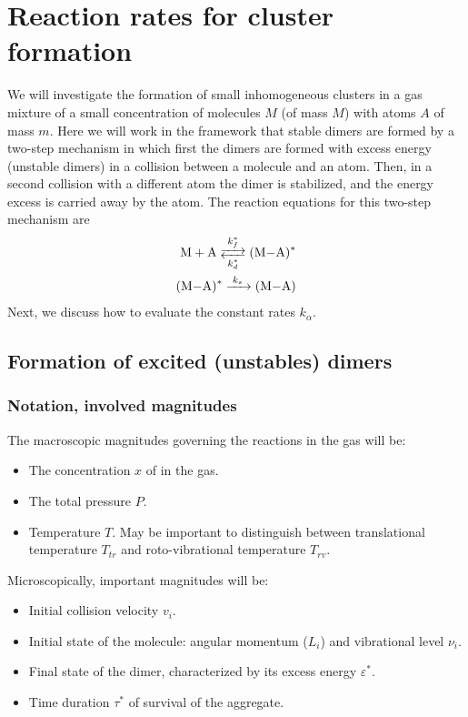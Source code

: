 \chapter{Reaction rates for cluster formation}
\label{C:react-rates-cluster}
We will investigate the formation of small inhomogeneous clusters in a gas mixture of a small concentration of molecules $M$ (of mass $M$) with atoms $A$ of mass $m$.
Here we will work in the framework that stable dimers are formed by a two-step mechanism in which first the dimers are formed with excess energy (unstable dimers) in a collision between a molecule and an atom. Then, in a second collision with a different atom the dimer is stabilized, and the energy excess is carried away by the atom. The reaction equations for this two-step mechanism are
\begin{subequations}
\begin{align}
  \label{Q:rates-master-equation-a}
  \ce{M + A <-->[{k_{f}^{*}}][{k_{d}^{*}}] (M-A)^{*}} \\
  \label{Q:rates-master-equation-b}
  \ce{ (M-A)^{*} ->[{k_{s}}] (M-A)} 
\end{align}
\end{subequations}
%
Next, we discuss how to evaluate the constant rates $k_{\alpha}$.

\section{Formation of excited (unstables) dimers}
\label{S:excit-unst-dimers}

\subsection{Notation, involved magnitudes}
\label{S:cant-de-inter}

The macroscopic magnitudes governing the reactions in the gas will be:
\begin{itemize}
\item The concentration $x$ of  in the gas.
\item The total pressure $P$.
\item Temperature $T$. May be important to distinguish between translational temperature $T_{tr}$ and roto-vibrational temperature $T_{rv}$.
\end{itemize}

Microscopically, important magnitudes will be:
\begin{itemize}
\item Initial collision velocity $v_{i}$.
\item Initial state of the molecule: angular momentum ($L_{i}$) and vibrational level $\nu_{i}$.
\item Final state of the dimer, characterized by its excess energy $\varepsilon^{*}$.
\item Time duration $\tau^{*}$ of survival of the aggregate.
\end{itemize}



